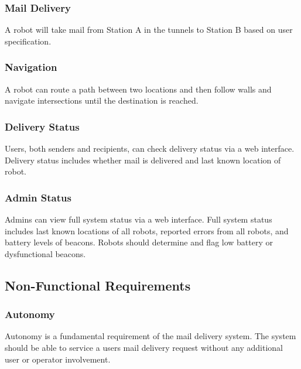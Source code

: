 \documentclass[12pt]{report}
\begin{document}
\subsubsection{Mail Delivery}
A robot will take mail from Station A in the tunnels to Station B based on user specification.
\subsubsection{Navigation}
A robot can route a path between two locations and then follow walls and navigate intersections until the destination is reached.
\subsubsection{Delivery Status}
Users, both senders and recipients, can check delivery status via a web interface. Delivery status includes whether mail is delivered and last known location of robot.
\subsubsection{Admin Status}
Admins can view full system status via a web interface. Full system status includes last known locations of all robots, reported errors from all robots, and battery levels of beacons. Robots should determine and flag low battery or dysfunctional beacons.
\subsection{Non-Functional Requirements}
\subsubsection{Autonomy}
Autonomy is a fundamental requirement of the mail delivery system. The system should be able to service a users mail delivery request without any additional user or operator involvement.
\end{document}
